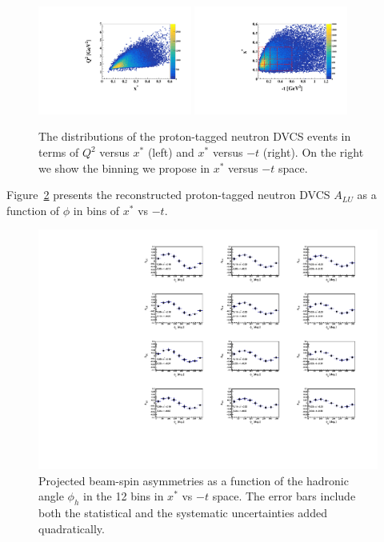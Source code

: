 \begin{figure}[htb]
  \centering
    \includegraphics[width=0.45\textwidth,clip]{figs/pdf/Q2_x*.pdf}
    \includegraphics[width=0.45\textwidth,clip]{figs/pdf/t_x*.pdf}
   \caption{The distributions of the proton-tagged neutron DVCS events in terms 
   of $Q^2$ versus $x^*$ (left) and  $x^{*}$ versus $-t$ (right). On the right 
   we show the binning we propose in $x^{*}$ versus $-t$ space.
   \label{fig:binning_x_t}}
\end{figure}


Figure~\ref{fig:alu_tagged} presents the reconstructed proton-tagged neutron 
DVCS  $A_{LU}$ as a function of $\phi$ in bins of $x^{*}$ vs $-t$.  

\begin{figure}[htb]
  \centering
    \includegraphics[width=1.1\textwidth,clip]{figs/pdf/BSA_incoherent_Phi_x_t.pdf}
  \caption{Projected beam-spin asymmetries as a function of the hadronic angle 
   $\phi_h$ in the 12 bins in $x^{*}$ vs $-t$ space. The error bars include 
   both the statistical and the systematic uncertainties added quadratically.
   \label{fig:alu_tagged}}
\end{figure}




